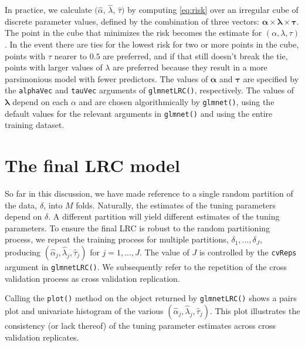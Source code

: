 \documentclass{article}
\begin{document}
In practice, we calculate $(\hat\alpha$, $\hat\lambda$, $\hat\tau)$ by computing \eqref{eq:risk} over an irregular
cube of discrete parameter values, defined by the combination of three vectors:  
$\boldsymbol\alpha \times \boldsymbol\lambda \times \boldsymbol\tau$.
The point in the cube that minimizes the risk becomes the estimate for $(\alpha, \lambda, \tau)$. In the event there
are ties for the lowest risk for two or more points in the cube, points with $\tau$ nearer to $0.5$ are preferred, and
if that still doesn't break the tie, points with larger values of $\lambda$ are preferred because they result in
a more parsimonious model with fewer predictors.
The values of $\boldsymbol\alpha$ and $\boldsymbol\tau$ are specified by the {\tt alphaVec} and {\tt tauVec} arguments
of {\tt glmnetLRC()}, respectively.  The values of $\boldsymbol\lambda$ depend on each $\alpha$ and are chosen algorithmically
by {\tt glmnet()}, using the default values for the relevant arguments in {\tt glmnet()} and using the entire training dataset.

\section{The final LRC model}

So far in this discussion, we have made reference to a single random partition of the data, $\delta$, into $M$ folds. 
Naturally, the estimates of the tuning parameters depend on $\delta$. A different partition will yield different
estimates of the tuning parameters.  To ensure the final LRC is robust to the random 
partitioning process, we repeat the training process for multiple partitions, $\delta_1,\ldots,\delta_J$, producing
$(\hat\alpha_j, \hat\lambda_j, \hat\tau_j)$ for $j = 1,\ldots,J$.  
The value of $J$ is controlled by the {\tt cvReps} argument in {\tt glmnetLRC()}. We subsequently
refer to the repetition of the cross validation process as cross validation replication.

Calling the {\tt plot()} method
on the object returned by {\tt glmnetLRC()} shows a pairs plot and univariate histogram of the
various $(\hat\alpha_j, \hat\lambda_j, \hat\tau_j)$.  This plot illustrates the consistency (or lack thereof) 
of the tuning parameter estimates across cross validation replicates.
\end{document}
